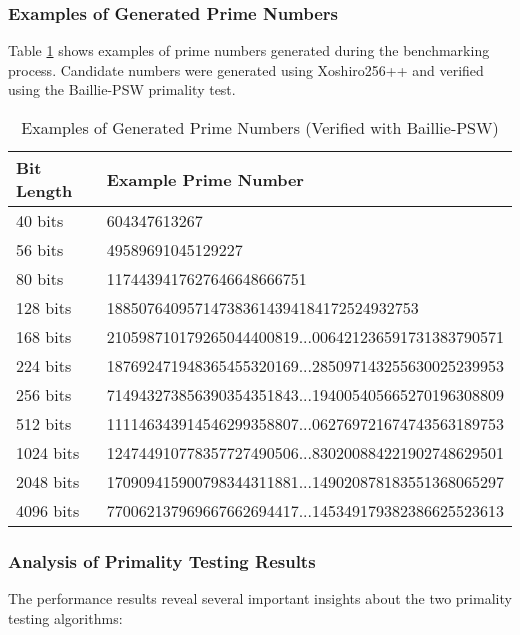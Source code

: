 \subsubsection{Examples of Generated Prime Numbers}

Table \ref{tab:generated_primes} shows examples of prime numbers generated during the benchmarking process. Candidate numbers were generated using Xoshiro256++ and verified using the Baillie-PSW primality test.

\begin{table}[H]
\centering
\caption{Examples of Generated Prime Numbers (Verified with Baillie-PSW)}
\label{tab:generated_primes}
\begin{tabular}{@{}ll@{}}
\toprule
\textbf{Bit Length} & \textbf{Example Prime Number} \\
\midrule
40 bits     & 604347613267 \\
56 bits     & 49589691045129227 \\
80 bits     & 1174439417627646648666751 \\
128 bits    & 188507640957147383614394184172524932753 \\
168 bits    & 210598710179265044400819...006421236591731383790571 \\
224 bits    & 187692471948365455320169...285097143255630025239953 \\
256 bits    & 714943273856390354351843...194005405665270196308809 \\
512 bits    & 111146343914546299358807...062769721674743563189753 \\
1024 bits   & 124744910778357727490506...830200884221902748629501 \\
2048 bits   & 170909415900798344311881...149020878183551368065297 \\
4096 bits   & 770062137969667662694417...145349179382386625523613 \\
\bottomrule
\end{tabular}
\end{table}



\subsubsection{Analysis of Primality Testing Results}

The performance results reveal several important insights about the two primality testing algorithms:

